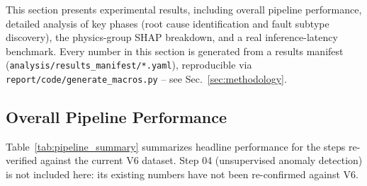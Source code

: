 
\label{sec:results}

This section presents experimental results, including overall pipeline performance, detailed analysis of key phases (root cause identification and fault subtype discovery), the physics-group SHAP breakdown, and a real inference-latency benchmark. Every number in this section is generated from a results manifest (\texttt{analysis/results\_manifest/*.yaml}), reproducible via \texttt{report/code/generate\_macros.py} -- see Sec.~\ref{sec:methodology}.

\subsection{Overall Pipeline Performance}

Table~\ref{tab:pipeline_summary} summarizes headline performance for the steps re-verified against the current V6 dataset. Step 04 (unsupervised anomaly detection) is not included here: its existing numbers have not been re-confirmed against V6. %

